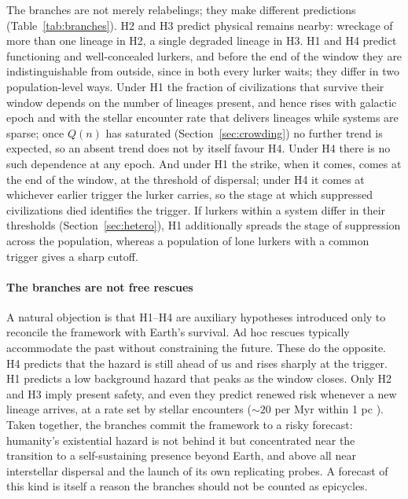 \documentclass[preprint,12pt]{elsarticle}
\theoremstyle{definition}
\begin{document}
The branches are not merely relabelings; they make different predictions (Table~\ref{tab:branches}). H2 and H3 predict physical remains nearby: wreckage of more than one lineage in H2, a single degraded lineage in H3. H1 and H4 predict functioning and well-concealed lurkers, and before the end of the window they are indistinguishable from outside, since in both every lurker waits; they differ in two population-level ways. Under H1 the fraction of civilizations that survive their window depends on the number of lineages present, and hence rises with galactic epoch and with the stellar encounter rate that delivers lineages while systems are sparse; once $Q(n)$ has saturated (Section~\ref{sec:crowding}) no further trend is expected, so an absent trend does not by itself favour H4. Under H4 there is no such dependence at any epoch. And under H1 the strike, when it comes, comes at the end of the window, at the threshold of dispersal; under H4 it comes at whichever earlier trigger the lurker carries, so the stage at which suppressed civilizations died identifies the trigger. If lurkers within a system differ in their thresholds (Section~\ref{sec:hetero}), H1 additionally spreads the stage of suppression across the population, whereas a population of lone lurkers with a common trigger gives a sharp cutoff.

\paragraph{The branches are not free rescues}
A natural objection is that H1--H4 are auxiliary hypotheses introduced only to reconcile the framework with Earth's survival. Ad hoc rescues typically accommodate the past without constraining the future. These do the opposite. H4 predicts that the hazard is still ahead of us and rises sharply at the trigger. H1 predicts a low background hazard that peaks as the window closes. Only H2 and H3 imply present safety, and even they predict renewed risk whenever a new lineage arrives, at a rate set by stellar encounters ($\sim\!20$ per Myr within 1 pc \citep{BailerJones2018}). Taken together, the branches commit the framework to a risky forecast: humanity's existential hazard is not behind it but concentrated near the transition to a self-sustaining presence beyond Earth, and above all near interstellar dispersal and the launch of its own replicating probes. A forecast of this kind is itself a reason the branches should not be counted as epicycles.
\end{document}
